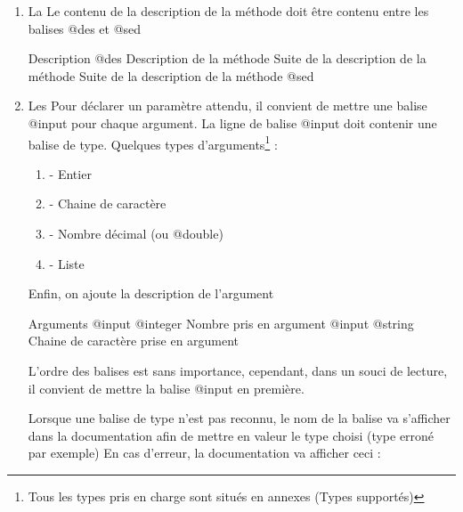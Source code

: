 \begin{enumerate}
\begin{enumerate}
        \end{enumerate}

    \item La  \newline
    Le contenu de la description de la méthode doit être contenu entre les balises @des et @sed
    \begin{Bash}{Description}
    @des
    Description de la méthode
    Suite de la description de la méthode
    Suite de la description de la méthode
    @sed
    \end{Bash}

    \item Les 
    Pour déclarer un paramètre attendu, il convient de mettre une balise @input pour chaque argument.
    La ligne de balise @input doit contenir une balise de type. \newline
    Quelques types d'arguments\footnote{Tous les types pris en charge sont situés en annexes (Types supportés)} :
    
    \begin{enumerate}
    \item {} - Entier 
    \item {} - Chaine de caractère 
    \item {} - Nombre décimal (ou @double) 
    \item {} - Liste 
    \end{enumerate}
    Enfin, on ajoute la description de l'argument
    
    \begin{Bash}{Arguments}
    @input @integer Nombre pris en argument
    @input @string Chaine de caractère prise en argument
    \end{Bash}
    L'ordre des balises est sans importance, cependant, dans un souci de lecture, il convient de mettre la balise @input en première.\newline
    
    Lorsque une balise de type n'est pas reconnu, le nom de la balise va s'afficher dans la documentation afin de mettre en valeur le type choisi (type erroné par exemple)
    \newpage
    En cas d'erreur, la documentation va afficher ceci : \newline \newline
    

\end{enumerate}
